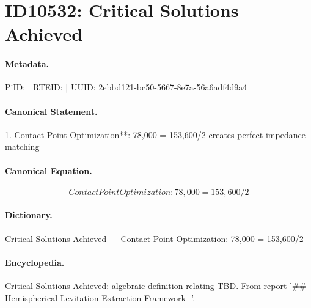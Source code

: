 \section*{ID10532: Critical Solutions Achieved}
\paragraph{Metadata.}
PiID:  | RTEID:  | UUID: 2ebbd121-bc50-5667-8e7a-56a6adf4d9a4

\paragraph{Canonical Statement.}
1. Contact Point Optimization**: 78,000 = 153,600/2 creates perfect impedance matching

\paragraph{Canonical Equation.}
\[
Contact Point Optimization: 78,000 = 153,600/2
\]

\paragraph{Dictionary.}
Critical Solutions Achieved — Contact Point Optimization: 78,000 = 153,600/2

\paragraph{Encyclopedia.}
Critical Solutions Achieved: algebraic definition relating TBD. From report '\#\# Hemispherical Levitation-Extraction Framework- '.
